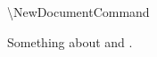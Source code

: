 \documentclass{article}
\begin{document}
\textbackslash NewDocumentCommand

Something about  and .
\end{document}

